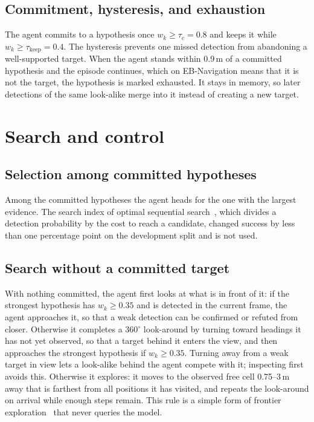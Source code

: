 \subsection{Commitment, hysteresis, and exhaustion}
\label{sec:method-commit}
The agent commits to a hypothesis once $w_k\ge\tau_\mathrm{c}=0.8$ and keeps it while $w_k\ge\tau_\mathrm{keep}=0.4$. The hysteresis
prevents one missed detection from abandoning a well-supported target. When the agent stands within 0.9\,m of a
committed hypothesis and the episode continues, which on EB-Navigation means that it is not the target, the
hypothesis is marked exhausted. It stays in memory, so later detections of the same look-alike merge into it instead
of creating a new target.

\section{Search and control}
\label{sec:method-control}
\subsection{Selection among committed hypotheses}
Among the committed hypotheses the agent heads for the one with the largest evidence. The search index of optimal
sequential search~\cite{kadane1977optimal}, which divides a detection probability by the cost to reach a candidate,
changed success by less than one percentage point on the development split and is not used.

\subsection{Search without a committed target}
\label{sec:method-search}
With nothing committed, the agent first looks at what is in front of it: if the strongest hypothesis has
$w_k\ge0.35$ and is detected in the current frame, the agent approaches it, so that a weak detection can be confirmed
or refuted from closer. Otherwise it completes a 360$^\circ$ look-around by turning toward headings it has not yet
observed, so that a target behind it enters the view, and then approaches the strongest hypothesis if $w_k\ge0.35$.
Turning away from a weak target in view lets a look-alike behind the agent compete with it; inspecting first avoids
this. Otherwise it explores: it moves to the observed free cell 0.75--3\,m away that is farthest from
all positions it has visited, and repeats the look-around on arrival while enough steps remain. This rule is a
simple form of frontier exploration~\cite{yamauchi1997frontier} that never queries the model.

